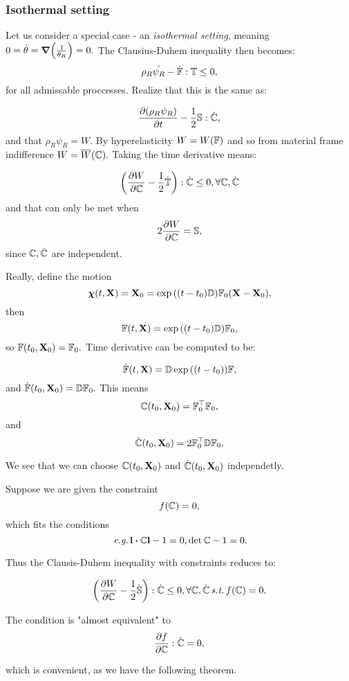 \documentclass[reqno, a4paper]{article}
\begin{document}
\subsubsection{Isothermal setting}
\label{sec:isothermal}
Let us consider a special case - an \textit{isothermal setting}, meaning $0 = \dot{\theta} = \grad\qty(\frac{1}{\theta_R}) = 0.$ The Clausius-Duhem inequality then becomes:
\[
	\rho_R \dot{\psi_R} - \dot{\mathbb{F}} : \mathbb{T} \leq 0,
\]
for all admissable proccesses. Realize that this is the same as:

\[
	\pdv{\qty(\rho_R \psi_R)}{t} - \frac{1}{2}\mathbb{S}:\dot{\mathbb{C}},
\]
and that $\rho_R \psi_R = W.$ By hyperelasticity $W = W\qty(\mathbb{F})$ and so from material frame indifference $W = \overline{W}\qty(\mathbb{C}).$ Taking the time derivative means:

\[
	\qty(\pdv{W}{\ensuremath{\mathbb{C}}}-\frac{1}{2}\dot{\mathbb{T}}):\dot{\mathbb{C}} \leq 0, \forall \mathbb{C}, \dot{\mathbb{C}}
\]
and that can only be met when
\[
	2 \pdv{W}{\ensuremath{\mathbb{C}}} = \mathbb{S},
\]
since $\mathbb{C}, \dot{\mathbb{C}}$ are independent.

Really, define the motion
\[
	\vb*{\chi}\qty(t,\vb{X}) = \vb{X}_0 = \exp\qty(\qty(t-t_0)\mathbb{D}) \mathbb{F}_0\qty(\vb{X}-\vb{X}_0),
\]
then
\[
	\mathbb{F}\qty(t,\vb{X}) = \exp\qty(\qty(t-t_0)\mathbb{D})\mathbb{F}_0,
\]
so $\mathbb{F}\qty(t_0, \vb{X}_0) = \mathbb{F}_0.$ Time derivative can be computed to be:

\[
	\dot{\mathbb{F}} \qty(t,\vb{X})= \mathbb{D} \exp\qty(\qty(t-t_0))\mathbb{F},
\]
and $\dot{\mathbb{F}}\qty(t_0, \vb{X}_0) = \mathbb{D}\mathbb{F}_0.$ This means
\[
	\mathbb{C}\qty(t_0, \vb{X}_0) = \mathbb{F}_0^\top\mathbb{F}_0,
\]
and
\[
	\dot{\mathbb{C}}\qty(t_0, \vb{X}_0) = 2 \mathbb{F}_0^\top \mathbb{D} \mathbb{F}_0,
\]

We see that we can choose $\mathbb{C}\qty(t_0, \vb{X}_0)$ and $\dot{\mathbb{C}}\qty(t_0, \vb{X}_0)$ independetly.

Suppose we are given the constraint
\[
	f\qty(\mathbb{C}) = 0,
\]
which fits the conditions
\[
	\, \text{\textit{e.g.}} \,\vb{l}\vdot \rcg \vb{l}-1 = 0, \det \rcg -1 =0.
\]

Thus the Clausis-Duhem inequality with constraints reduces to:
\begin{tcolorbox}
\begin{equation}
	\label{eq:constraint_CD}
	\qty(\pdv{W}{\ensuremath{\mathbb{C}}}- \frac{1}{2}\dot{\mathbb{S}}): \dot{\mathbb{C}} \leq 0, \forall \mathbb{C}, \dot{\mathbb{C}} \, \text{\textit{s.t.}} \, f\qty(\mathbb{C})=0.
\end{equation}

The condition is "almost equivalent" to
\[
	\pdv{f}{\ensuremath{\mathbb{C}}}:\dot{\mathbb{C}} = 0,
\]
\end{tcolorbox}
which is convenient, as we have the following theorem.
\end{document}
